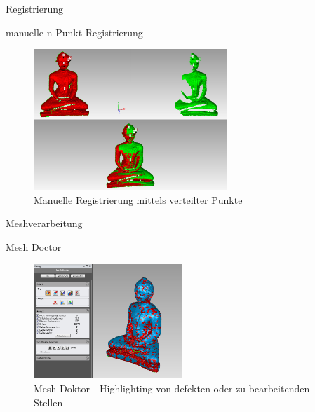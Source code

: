 \documentclass[11pt]{beamer}
\begin{document}
\begin{frame}{Registrierung}

\begin{block}{manuelle n-Punkt Registrierung}
\begin{figure}[H]
\centering
\includegraphics[width=0.65\textwidth]{images/GeoMagicBudhaPictures/Budha_Scans_Aufrecht_manualRegistration_03.PNG}
\caption{Manuelle Registrierung mittels verteilter Punkte}
\label{fig:budhaManual}
\end{figure}
\end{block}

\end{frame}


\begin{frame}{Meshverarbeitung}

\begin{block}{Mesh Doctor}
\begin{figure}[H]
\centering
\includegraphics[width=0.5\textwidth]{images/GeoMagicBudhaPictures/Budha_MeshDoctor.PNG}
\caption{Mesh-Doktor - Highlighting von defekten oder zu bearbeitenden Stellen}
\label{fig:budhaMeshDoc}
\end{figure}
\end{block}

\end{frame}
\end{document}
